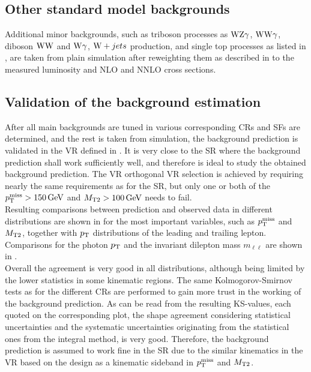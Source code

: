 \subsection{Other standard model backgrounds}
Additional minor backgrounds, such as triboson processes as $\mathrm{W}\mathrm{Z}\gamma$, $\mathrm{W}\mathrm{W}\gamma$, diboson $\mathrm{W}\mathrm{W}$ and $\mathrm{W}\gamma$, $\mathrm{W}+jets$ production, and single top processes as listed in , are taken from plain simulation after reweighting them as described in  to the measured luminosity and NLO and NNLO cross sections.

\FloatBarrier
\subsection{Validation of the background estimation}\label{sec:Validation}
After all main backgrounds are tuned in various corresponding CRs and SFs are determined, and the rest is taken from simulation, the background prediction is validated in the VR defined in . It is very close to the SR where the background prediction shall work sufficiently well, and therefore is ideal to study the obtained background prediction. The VR orthogonal VR selection is achieved by requiring nearly the same requirements as for the SR, but only one or both of the $p_{\mathrm{T}}^\text{miss}>150\,\text{Ge\hspace{-.08em}V}$ and $M_{\mathrm{T2}}>100\,\text{Ge\hspace{-.08em}V}$ needs to fail.\\
Resulting comparisons between prediction and observed data in different distributions are shown in  for the most important variables, such as $p_{\mathrm{T}}^\text{miss}$ and $M_{\mathrm{T2}}$, together with $p_{\mathrm{T}}$ distributions of the leading and trailing lepton. Comparisons for the photon $p_{\mathrm{T}}$ and the invariant dilepton mass $m_{\ell\ell}$ are shown in .\\
Overall the agreement is very good in all distributions, although being limited by the lower statistics in some kinematic regions. The same Kolmogorov-Smirnov tests as for the different CRs are performed to gain more trust in the working of the background prediction. As can be read from the resulting KS-values, each quoted on the corresponding plot, the shape agreement considering statistical uncertainties and the systematic uncertainties originating from the statistical ones from the integral method, is very good. Therefore, the background prediction is assumed to work fine in the SR due to the similar kinematics in the VR based on the design as a kinematic sideband in $p_{\mathrm{T}}^\text{miss}$ and $M_{\mathrm{T2}}$.

